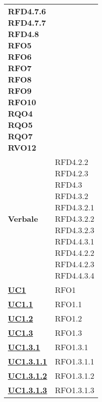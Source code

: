 \begin{longtable}[H]{| >{\centering\bfseries}p{8cm} | >{\centering\arraybackslash}p{8cm} |}
{            RFD4.7.6 \\
            RFD4.7.7 \\
            RFD4.8 \\
            RFO5 \\
            RFO6 \\
            RFO7 \\
            RFO8 \\
            RFO9 \\
            RFO10 \\
            RQO4 \\
            RQO5 \\
            RQO7 \\
            RVO12
        } \\

    Verbale &
        \makecell{
            RFD4.2.2 \\
            RFD4.2.3 \\
            RFD4.3 \\
            RFD4.3.2\\
            RFD4.3.2.1 \\
            RFD4.3.2.2 \\
            RFD4.3.2.3 \\
            RFD4.4.3.1 \\
            RFD4.4.2.2 \\
            RFD4.4.2.3 \\
            RFD4.4.3.4
        } \\

    \hyperref[sub:uc1]{UC1} & RFO1 \\

    \hyperref[ssub:uc1.1]{UC1.1} & RFO1.1 \\

    \hyperref[sub:uc1.2]{UC1.2} &  RFO1.2\\

    \hyperref[ssub:uc1.3]{UC1.3} & RFO1.3 \\

    \hyperref[par:uc1.3.1]{UC1.3.1} & RFO1.3.1 \\

    \hyperref[spar:uc1.3.1.1]{UC1.3.1.1} & RFO1.3.1.1 \\

    \hyperref[spar:uc1.3.1.2]{UC1.3.1.2} & RFO1.3.1.2 \\

    \hyperref[spar:uc1.3.1.3]{UC1.3.1.3} & RFO1.3.1.3 \\


\end{longtable}
